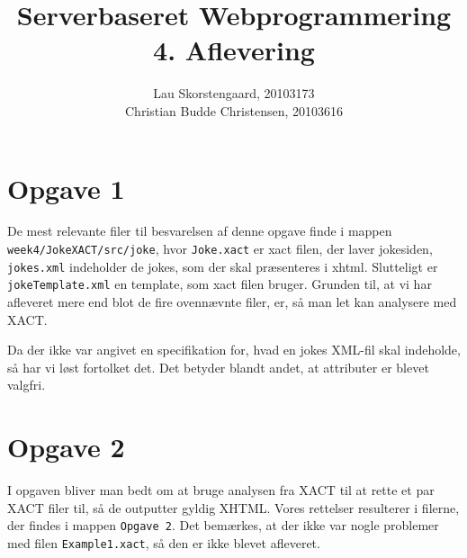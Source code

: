 \documentclass[a4paper,10pt]{article}
\author{Lau Skorstengaard, 20103173 \\Christian Budde Christensen, 20103616}
\title{Serverbaseret Webprogrammering\\4. Aflevering}
\begin{document}
\maketitle
\section*{Opgave 1}
De mest relevante filer til besvarelsen af denne opgave finde i mappen \texttt{week4/JokeXACT/src/joke}, hvor \texttt{Joke.xact} er xact filen, der laver jokesiden, \texttt{jokes.xml} indeholder de jokes, som der skal præsenteres i xhtml. Slutteligt er \texttt{jokeTemplate.xml} en template, som xact filen bruger. Grunden til, at vi har afleveret mere end blot de fire ovennævnte filer, er, så man let kan analysere med XACT.

Da der ikke var angivet en specifikation for, hvad en jokes XML-fil skal indeholde, så har vi løst fortolket det. Det betyder blandt andet, at attributer er blevet valgfri.

\section*{Opgave 2}
I opgaven bliver man bedt om at bruge analysen fra XACT til at rette et par XACT filer til, så de outputter gyldig XHTML. Vores rettelser resulterer i filerne, der findes i mappen \texttt{Opgave 2}. Det bemærkes, at der ikke var nogle problemer med filen \texttt{Example1.xact}, så den er ikke blevet afleveret.
\end{document}
